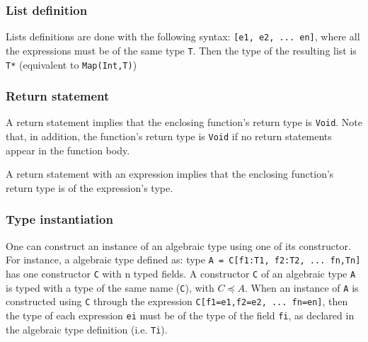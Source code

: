 \documentclass[11pt]{article}
\begin{document}
\begin{center}
  
\DP
\end{center}

\subsubsection{List definition}

Lists definitions are done with the following syntax: \texttt{[e1, e2, ... en]}, where all the expressions must be of the same type \texttt{T}. Then the type of the resulting list is \texttt{T*} (equivalent to \texttt{Map(Int,T)})

\begin{center}
\DP
\end{center}

\subsubsection{Return statement}

A return statement implies that the enclosing function's return type is \texttt{Void}. Note that, in addition, the function's return type is \texttt{Void} if no return statements appear in the function body.

\begin{center}
\DP
\end{center}

A return statement with an expression implies that the enclosing function's return type is of the expression's type.

\begin{center}
  
\DP
\end{center}

\subsubsection{Type instantiation}

One can construct an instance of an algebraic type using one of its constructor. For instance, a algebraic type defined as: type \texttt{A = C[f1:T1, f2:T2, ... fn,Tn]} has one constructor \texttt{C} with n typed fields. A constructor \texttt{C} of an algebraic type \texttt{A} is typed with a type of the same name (\texttt{C}), with $C \preceq A$. When an instance of \texttt{A} is constructed using \texttt{C} through the expression \texttt{C[f1=e1,f2=e2, ... fn=en]}, then the type of each expression \texttt{ei} must be of the type of the field \texttt{fi}, as declared in the algebraic type definition (i.e. \texttt{Ti}).
\end{document}
